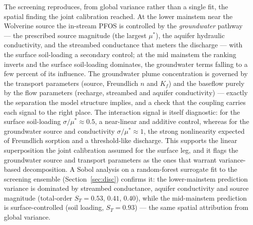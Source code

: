 The screening reproduces, from global variance rather than a single fit, the spatial finding the
joint calibration reached. At the lower mainstem near the Wolverine source the in-stream PFOS is
controlled by the \emph{groundwater} pathway --- the prescribed source magnitude (the largest
$\mu^*$), the aquifer hydraulic conductivity, and the streambed conductance that meters the
discharge --- with the surface soil-loading a secondary control; at the mid mainstem the ranking
inverts and the surface soil-loading dominates, the groundwater terms falling to a few percent of
its influence. The groundwater plume concentration is governed by the transport parameters (source,
Freundlich $n$ and $K_f$) and the baseflow purely by the flow parameters (recharge, streambed and
aquifer conductivity) --- exactly the separation the model structure implies, and a check that the
coupling carries each signal to the right place. The interaction signal is itself diagnostic: for
the surface soil-loading $\sigma/\mu^*\approx0.5$, a near-linear and additive control, whereas for
the groundwater source and conductivity $\sigma/\mu^*\approx1$, the strong nonlinearity expected of
Freundlich sorption and a threshold-like discharge. This supports the linear superposition the joint
calibration assumed for the surface leg, and it flags the groundwater source and transport
parameters as the ones that warrant variance-based decomposition. A Sobol analysis on a random-forest
surrogate fit to the screening ensemble (Section~\ref{sec:disc}) confirms it: the lower-mainstem
prediction variance is dominated by streambed conductance, aquifer conductivity and source magnitude
(total-order $S_T=0.53$, $0.41$, $0.40$), while the mid-mainstem prediction is surface-controlled
(soil loading, $S_T=0.93$) --- the same spatial attribution from global variance.
